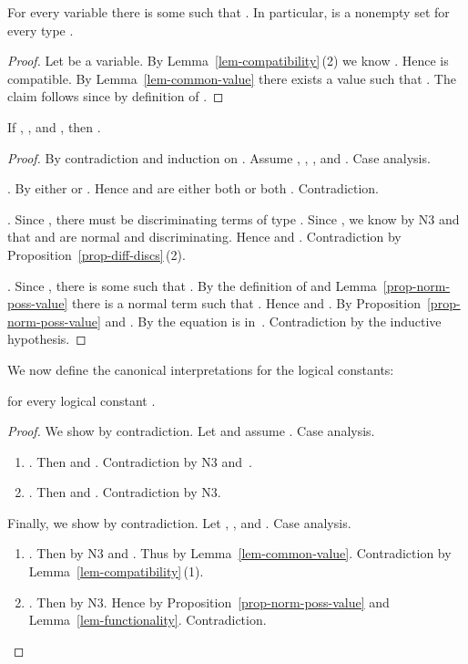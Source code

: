 \begin{lem}[Admissibility]
  \label{lemma-inhabitation}
  For every variable  there is some 
  such that .  In particular,
   is a nonempty set for every type
  .
\end{lem}

\begin{proof}
  Let  be a variable.  By
  Lemma~\ref{lem-compatibility}\,(2) we know .
  Hence  is compatible.  By
  Lemma~\ref{lem-common-value} there exists a value 
  such that .  The claim follows
  since  by definition of .
\end{proof}

\begin{lem}[Functionality]
  \label{lem-functionality}
  If , , and
   , then .
\end{lem}

\begin{proof}
  By contradiction and induction on .  Assume
  , , , and .  Case analysis.

  .  By  either  or .  Hence  and  are either both
   or both .  Contradiction.

  .  Since , there must be
  discriminating terms of type .  Since
  , we know by N3 and \ECon that  and
   are normal and discriminating.  Hence 
  and .  Contradiction by
  Proposition~\ref{prop-diff-discs}\,(2).

  .  Since , there is some
   such that .
  By the
  definition of  and
  Lemma~\ref{prop-norm-poss-value} there is a normal
  term  such that .
  Hence  and .  By
  Proposition~\ref{prop-norm-poss-value}  and .
  By  the
  equation  is in~.
  Contradiction by the inductive hypothesis.
\end{proof}

We now define the canonical interpretations for the logical constants:


\begin{lem}
  \label{lem-log-constants}
   for every logical constant .
\end{lem}

\begin{proof}
  We show  by contradiction.
  Let  and assume . Case analysis.
  \begin{enumerate}[]
  \item .  Then  and .  Contradiction
    by N3 and~.
  \item .  Then  and .
    Contradiction by N3.
  \end{enumerate}
Finally, we show  by
  contradiction.  Let ,
  , and
  .  Case analysis.
  \begin{enumerate}[]
  \item .  Then  by N3 and
    .  Thus  by
    Lemma~\ref{lem-common-value}.  Contradiction by
    Lemma~\ref{lem-compatibility}\,(1).
  \item .  Then  by
    N3. Hence  by
    Proposition~\ref{prop-norm-poss-value}
    and Lemma~\ref{lem-functionality}.  Contradiction.\qedhere
  \end{enumerate}
\end{proof}

